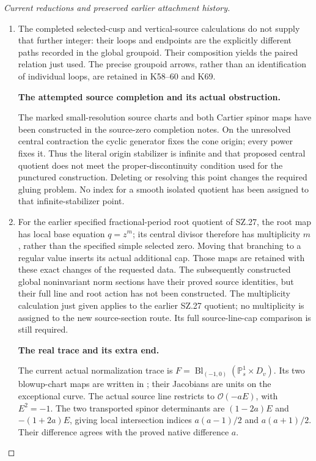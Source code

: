 \begin{proof}[Current reductions and preserved earlier attachment history]
\begin{enumerate}[label=\arabic*.]
\item The completed selected-cusp and vertical-source calculations
do not supply that further integer: their loops and endpoints
are the explicitly different paths recorded in the global
groupoid. Their composition yields the paired relation just
used. The precise groupoid arrows, rather than an identification
of individual loops, are retained in K58--60 and K69.

\par\medskip\noindent\textbf{The attempted source completion and its actual obstruction.}\par\nopagebreak[4]
The marked small-resolution source charts and both Cartier
spinor maps have been constructed in the source-zero completion
notes. On the unresolved central contraction the cyclic
generator fixes the cone origin; every power fixes it. Thus
the literal origin stabilizer is infinite and that proposed
central quotient does not meet the proper-discontinuity
condition used for the punctured construction. Deleting or
resolving this point changes the required gluing problem.
No index for a smooth isolated quotient has been assigned
to that infinite-stabilizer point.

\item For the earlier specified fractional-period root quotient
of SZ.27, the root map has local base equation \(q=z^m\);
its central
divisor therefore has multiplicity \(m\), rather than the
specified simple selected zero. Moving that branching to a
regular value inserts its actual additional cap. Those maps
are retained with these exact changes of the requested data.
The subsequently constructed global noninvariant norm sections
have their proved source identities, but their full line and
root action has not been constructed. The multiplicity
calculation just given applies to the earlier SZ.27 quotient;
no multiplicity is assigned to the new source-section route.
Its full source-line-cap comparison is still required.

\par\medskip\noindent\textbf{The real trace and its extra end.}\par\nopagebreak[4]
The current actual normalization trace is
\(F=\operatorname{Bl}_{(-1,0)}(\mathbb P^1_s\times D_v)\).
Its two blowup-chart maps are written in
; their
Jacobians are units on the exceptional curve. The actual
source line restricts to \(\mathcal O(-aE)\), with
\(E^2=-1\). The two transported spinor determinants are
\((1-2a)E\) and \(-(1+2a)E\), giving local intersection
indices \(a(a-1)/2\) and \(a(a+1)/2\). Their difference
agrees with the proved native difference \(a\).


\end{enumerate}
\end{proof}
